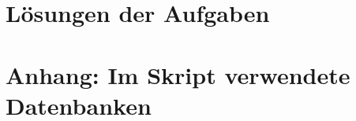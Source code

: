 \documentclass[a4paper,12pt, headsepline, ngerman]{scrartcl}
\theoremstyle{definition}
\begin{document}
%





\newpage
{}
\section{Lösungen der Aufgaben}
\shipoutAnswer
\newpage
{}
\section{Anhang: Im Skript verwendete Datenbanken}

\end{document}
